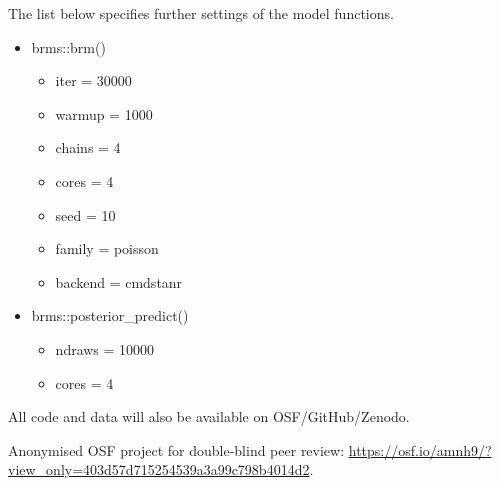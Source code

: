 \documentclass[12pt,letterpaper]{article}
\begin{document}
The list below specifies further settings of the model functions.

\begin{itemize}
    \item brms::brm()
    \begin{itemize}
    \item  iter = 30000
    \item  warmup = 1000
    \item  chains = 4
    \item  cores = 4
    \item  seed = 10
    \item family = poisson
    \item backend = cmdstanr
    \end{itemize}
    \item brms::posterior\_predict()
    \begin{itemize}
    \item  ndraws = 10000
    \item  cores = 4
    \end{itemize}
\end{itemize}

All code and data will also be available on OSF/GitHub/Zenodo.

Anonymised OSF project for double-blind peer review: \url{https://osf.io/amnh9/?view_only=403d57d715254539a3a99c798b4014d2}.







\end{document}

